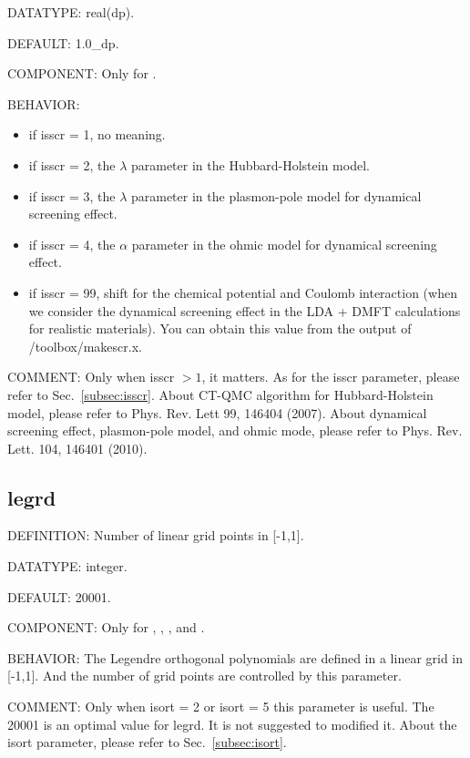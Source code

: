 {\color{green}DATATYPE:} real(dp).

{\color{blue}DEFAULT:} 1.0\_dp.

{\color{brown}COMPONENT:} Only for {\narcissus}.

{\color{purple}BEHAVIOR:}
\begin{itemize}
\item if isscr = 1, no meaning.
\item if isscr = 2, the $\lambda$ parameter in the Hubbard-Holstein model.
\item if isscr = 3, the $\lambda$ parameter in the plasmon-pole model for dynamical screening effect.
\item if isscr = 4, the $\alpha$ parameter in the ohmic model for dynamical screening effect.
\item if isscr = 99, shift for the chemical potential and Coulomb interaction (when we consider the dynamical screening effect in the LDA + DMFT calculations for realistic materials). You can obtain this value from the output of {\hibiscus}/toolbox/makescr.x.
\end{itemize}

{\color{olive}COMMENT:} Only when isscr $> 1$, it matters. As for the isscr parameter, please refer to Sec.~\ref{subsec:isscr}. About CT-QMC algorithm for Hubbard-Holstein model, please refer to Phys. Rev. Lett 99, 146404 (2007). About dynamical screening effect, plasmon-pole model, and ohmic mode, please refer to Phys. Rev. Lett. 104, 146401 (2010).

\subsection{legrd}
{\color{red}DEFINITION:} Number of linear grid points in [-1,1].

{\color{green}DATATYPE:} integer.

{\color{blue}DEFAULT:} 20001.

{\color{brown}COMPONENT:} Only for {\gardenia}, {\narcissus}, {\lavender}, and {\manjushaka}.

{\color{purple}BEHAVIOR:} The Legendre orthogonal polynomials are defined in a linear grid in [-1,1]. And the number of grid points are controlled by this parameter.

{\color{olive}COMMENT:} Only when isort = 2 or isort = 5 this parameter is useful. The 20001 is an optimal value for legrd. It is not suggested to modified it. About the isort parameter, please refer to Sec.~\ref{subsec:isort}.

